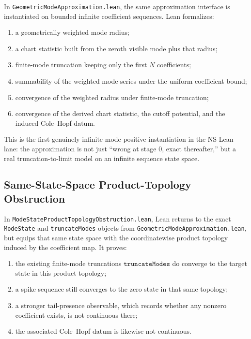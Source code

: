 \documentclass[11pt]{article}
\begin{document}
In \texttt{GeometricModeApproximation.lean}, the same approximation interface is
instantiated on bounded infinite coefficient sequences.  Lean formalizes:
\begin{enumerate}[leftmargin=1.5em]
  \item a geometrically weighted mode radius;
  \item a chart statistic built from the zeroth visible mode plus that radius;
  \item finite-mode truncation keeping only the first \(N\) coefficients;
  \item summability of the weighted mode series under the uniform coefficient
  bound;
  \item convergence of the weighted radius under finite-mode truncation;
  \item convergence of the derived chart statistic, the cutoff potential, and
  the induced Cole--Hopf datum.
\end{enumerate}

This is the first genuinely infinite-mode positive instantiation in the NS Lean
lane: the approximation is not just ``wrong at stage \(0\), exact thereafter,''
but a real truncation-to-limit model on an infinite sequence state space.

\subsection{Same-State-Space Product-Topology Obstruction}

In \texttt{ModeStateProductTopologyObstruction.lean}, Lean returns to the exact
\texttt{ModeState} and \texttt{truncateModes} objects from
\texttt{GeometricModeApproximation.lean}, but equips that same state space with
the coordinatewise product topology induced by the coefficient map.  It proves:
\begin{enumerate}[leftmargin=1.5em]
  \item the existing finite-mode truncations \(\texttt{truncateModes}\) do
  converge to the target state in this product topology;
  \item a spike sequence still converges to the zero state in that same
  topology;
  \item a stronger tail-presence observable, which records whether any
  nonzero coefficient exists, is not continuous there;
  \item the associated Cole--Hopf datum is likewise not continuous.
\end{enumerate}
\end{document}
